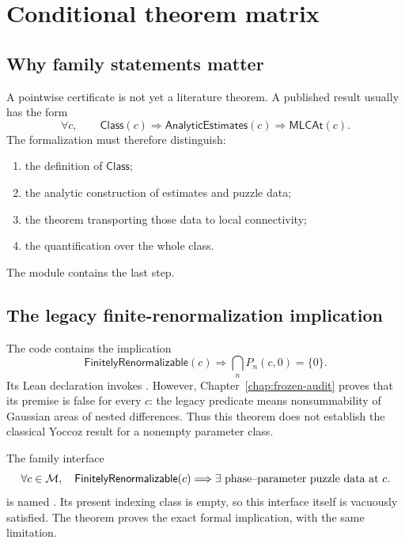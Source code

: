 \chapter{Conditional theorem matrix}
\label{ch:conditional-matrix}
\label{chap:theorem-matrix}

\section{Why family statements matter}

A pointwise certificate is not yet a literature theorem.  A published result
usually has the form
\[
\forall c,\qquad
\mathsf{Class}(c)\Longrightarrow
\mathsf{AnalyticEstimates}(c)\Longrightarrow
\mathsf{MLCAt}(c).
\]
The formalization must therefore distinguish:
\begin{enumerate}
\item the definition of $\mathsf{Class}$;
\item the analytic construction of estimates and puzzle data;
\item the theorem transporting those data to local connectivity;
\item the quantification over the whole class.
\end{enumerate}
The module  contains the last step.

\section{The legacy finite-renormalization implication}

The code contains the implication
\[
\mathsf{FinitelyRenormalizable}(c)
\Longrightarrow
\bigcap_n P_n(c,0)=\{0\}.
\]
Its Lean declaration
 invokes
.  However,
Chapter~\ref{chap:frozen-audit} proves that its premise is false for
every $c$: the legacy predicate means nonsummability of Gaussian
areas of nested differences.  Thus this theorem does not establish
the classical Yoccoz result for a nonempty parameter class.

The family interface
\[
\forall c\in\mathcal M,\quad
\mathsf{FinitelyRenormalizable}(c)
\Longrightarrow
\exists\ \text{phase--parameter puzzle data at }c.
\]
is named .
Its present indexing class is empty, so this interface itself is
vacuously satisfied.  The theorem
 proves the exact
formal implication, with the same limitation.

